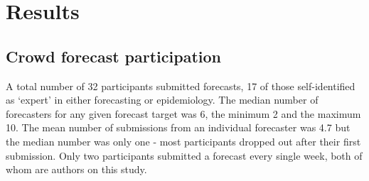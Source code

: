 \documentclass[
]{article}
\begin{document}
\hypertarget{results}{%
\section{Results}\label{results}}

\hypertarget{crowd-forecast-participation}{%
\subsection{Crowd forecast participation}\label{crowd-forecast-participation}}

A total number of 32 participants submitted forecasts, 17 of those self-identified as `expert' in either forecasting or epidemiology. The median number of forecasters for any given forecast target was 6, the minimum 2 and the maximum 10. The mean number of submissions from an individual forecaster was 4.7 but the median number was only one - most participants dropped out after their first submission. Only two participants submitted a forecast every single week, both of whom are authors on this study.
\end{document}
